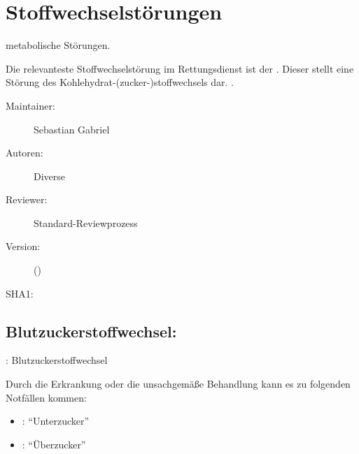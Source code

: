 \def\ChapterCode{STW}
\chapter
[\CO{[STW]} Stoffwechselstörungen]
{Stoffwechselstörungen}
\ChapterIntro
{%
 metabolische Störungen.

Die relevanteste Stoffwechselstörung im Rettungsdienst ist der
. Dieser
stellt eine Störung des Kohlehydrat-(zucker-)stoffwechsels dar.
. 
}
{%
\begin{description}
  \item[Maintainer:] Sebastian Gabriel
  \item[Autoren:] Diverse
  \item[Reviewer:] Standard-Reviewprozess
  \item[Version:] {\VarDocVersionTypeName} ({\VarDocVersionTypeDescription})
  \item[SHA1:] {\DocGitCommit}
\end{description}

{\TxTeilkapitelAASS}
}


\clearpage
\section{Blutzuckerstoffwechsel: }
\label{topic:diabetes}
\label{topic:diabetes-mellitus}



\Text
{\TxBeschreibung: Blutzuckerstoffwechsel}
{ 
Durch die Erkrankung oder die unsachgemäße Behandlung kann es zu 
folgenden Notfällen kommen:

\begin{itemize}
  \item {}: \enquote{Unterzucker}
  \item {}: \enquote{Überzucker}
\end{itemize}}
{}
{}
{}
{}


